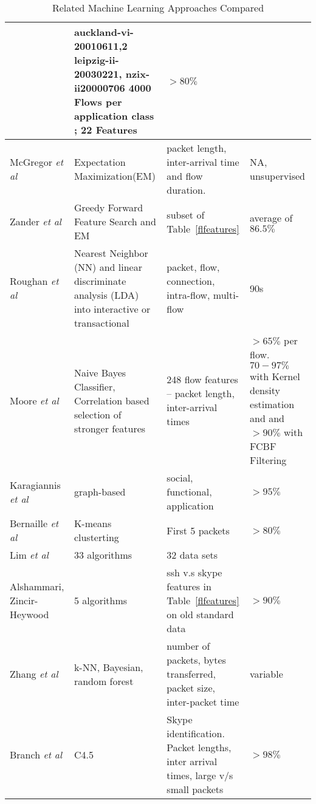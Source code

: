 \begin{table}[htbp]
\begin{small}
\begin{tabular}{||p{30mm}|p{35mm}|p{25mm}|p{25 mm}||}
 &auckland-vi-2001061{1,2}  leipzig-ii-20030221, nzix-ii20000706 4000 Flows per application class ; 22 Features & $> 80 \%$ \\
\hline
McGregor \emph{et al} \cite{mcgregor2004flow} &  Expectation Maximization(EM)   & packet length, inter-arrival time and flow duration. & NA, unsupervised\\
\hline
Zander \emph{et al}\cite{zander2005automated} &  Greedy Forward Feature Search and EM   & subset of Table~\ref{flfeatures} &  average of $86.5\%$\\
\hline
Roughan \emph{et al} \cite{roughan2004class} &  Nearest Neighbor (NN) and linear discriminate analysis (LDA) into interactive or  transactional& packet, flow, connection, intra-flow, multi-flow & 90s \\
\hline
Moore \emph{et al} \cite{moore2005internet}  & Naive Bayes Classifier, Correlation based  selection of stronger features  &  248 flow features -- packet length, inter-arrival times & $> 65 \%$ per flow. $70 - 97 \%$ with Kernel density estimation and  and $> 90\%$ with FCBF Filtering  \\
\hline
Karagiannis {\em et al} \cite{karagiannis2005blinc}&graph-based& social, functional, application& $> 95 \%$\\
\hline
Bernaille {\em et al} \cite{bernaille2006traffic}&  K-means clusterting & First 5 packets&$> 80 \%$  \\
\hline
Lim \emph{et al}\cite{lim2000comparison} &  33 algorithms &  32 data sets &\\
\hline
Alshammari, Zincir-Heywood \cite{alshammari2009machine}& 5 algorithms & ssh v.s skype features in Table~\ref{flfeatures} on old standard data &  $>90\%$ \\
\hline
Zhang {\em et al} \cite{zhang2013robust}& k-NN, Bayesian, random forest & number of packets, bytes transferred, packet size, inter-packet time & variable\\
\hline
Branch {\em et al}\cite{branch2009rapid}& C4.5 & Skype identification.  Packet lengths, inter arrival times, large v/s small packets& $>98\%$\\
\hline
\end{tabular}
\end{small}
\caption{\label{tab1} Related Machine Learning Approaches Compared}
\end{table}




